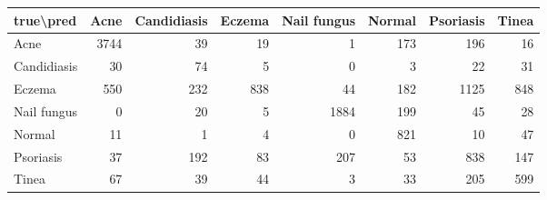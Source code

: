 \begin{tabular}{lrrrrrrr}
\toprule
true\textbackslash pred & Acne & Candidiasis & Eczema & Nail fungus & Normal & Psoriasis & Tinea \\
\midrule
Acne & 3744 & 39 & 19 & 1 & 173 & 196 & 16 \\
Candidiasis & 30 & 74 & 5 & 0 & 3 & 22 & 31 \\
Eczema & 550 & 232 & 838 & 44 & 182 & 1125 & 848 \\
Nail fungus & 0 & 20 & 5 & 1884 & 199 & 45 & 28 \\
Normal & 11 & 1 & 4 & 0 & 821 & 10 & 47 \\
Psoriasis & 37 & 192 & 83 & 207 & 53 & 838 & 147 \\
Tinea & 67 & 39 & 44 & 3 & 33 & 205 & 599 \\
\bottomrule
\end{tabular}
